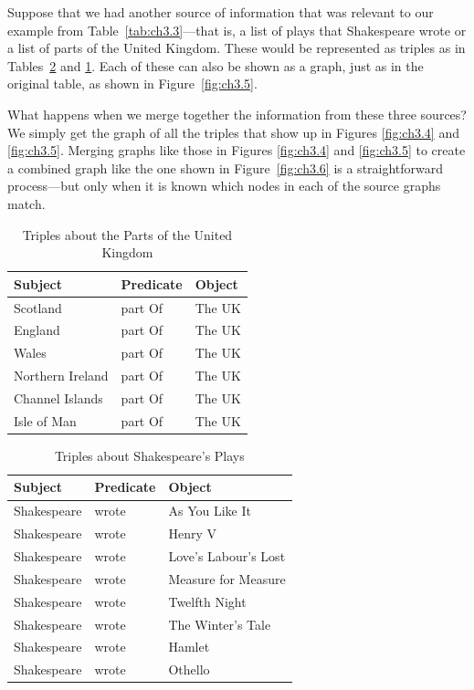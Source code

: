 Suppose that we had another source of information that was relevant to
our example from Table~\ref{tab:ch3.3}---that is, a list of plays that Shakespeare wrote or a list of parts
of the United Kingdom. These would be represented as triples as in
Tables~\ref{tab:ch3.4} and \ref{tab:ch3.5}. Each of these can also be shown as a graph, just as
in the original table, as shown in Figure~\ref{fig:ch3.5}.

What happens when we merge together the information from these three
sources? We simply get the graph of all the triples that show up in
Figures \ref{fig:ch3.4} and \ref{fig:ch3.5}. Merging graphs like those in 
Figures \ref{fig:ch3.4} and \ref{fig:ch3.5} to
create a combined graph like the one shown in Figure~\ref{fig:ch3.6} is a
straightforward process---but only when it is known which nodes in each
of the source graphs match.

\begin{table}[h]
\centering
\begin{tabular}{||l l l||} 
 \hline
 Subject&Predicate&Object \\ [0.5ex] 
 \hline\hline
Scotland&part Of&The UK \\
England&part Of&The UK \\
Wales&part Of&The UK\\
Northern Ireland&part Of&The UK \\
Channel Islands&part Of&The UK\\
Isle of Man&part Of&The UK\\
\hline
\end{tabular}
\caption{Triples about the Parts of the United Kingdom}
\label{tab:ch3.5}
\end{table}

\begin{table}[h]
\centering
\begin{tabular}{||l l l||} 
 \hline
 Subject&Predicate&Object \\ [0.5ex] 
 \hline\hline
Shakespeare&wrote&As You Like It\\
Shakespeare&wrote&Henry V\\
Shakespeare&wrote&Love's Labour's Lost \\
Shakespeare&wrote&Measure for Measure \\
Shakespeare&wrote&Twelfth Night \\
Shakespeare&wrote&The Winter's Tale \\
Shakespeare&wrote&Hamlet\\
Shakespeare&wrote&Othello\\
\hline
\end{tabular}
\caption{Triples about Shakespeare's Plays}
\label{tab:ch3.4}
\end{table}


